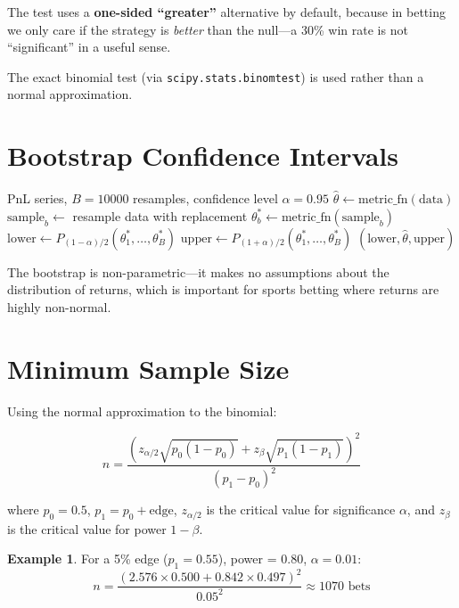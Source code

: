 \documentclass[12pt,a4paper]{report}
\theoremstyle{definition}
\newtheorem{example}{Example}[chapter]
\newcommand{\code}[1]{\texttt{#1}}
\begin{document}
The test uses a \textbf{one-sided ``greater''} alternative by default, because in betting we only care if the strategy is \emph{better} than the null—a 30\% win rate is not ``significant'' in a useful sense.

The exact binomial test (via \code{scipy.stats.binomtest}) is used rather than a normal approximation.

\section{Bootstrap Confidence Intervals}
\label{sec:bootstrap}

\begin{algorithm}[H]
\caption{Bootstrap Confidence Interval}
\begin{algorithmic}[1]
\Require PnL series, $B = 10000$ resamples, confidence level $\alpha = 0.95$
\State $\hat{\theta} \gets \text{metric\_fn}(\text{data})$ 
    \State $\text{sample}_b \gets$ resample data with replacement
    \State $\theta_b^* \gets \text{metric\_fn}(\text{sample}_b)$
\EndFor
\State $\text{lower} \gets P_{(1-\alpha)/2}(\theta_1^*, \ldots, \theta_B^*)$
\State $\text{upper} \gets P_{(1+\alpha)/2}(\theta_1^*, \ldots, \theta_B^*)$
\State \Return $(\text{lower}, \hat{\theta}, \text{upper})$
\end{algorithmic}
\end{algorithm}

The bootstrap is non-parametric—it makes no assumptions about the distribution of returns, which is important for sports betting where returns are highly non-normal.

\section{Minimum Sample Size}
\label{sec:min-sample}

Using the normal approximation to the binomial:

\begin{equation}
    n = \frac{\left(z_{\alpha/2}\sqrt{p_0(1-p_0)} + z_{\beta}\sqrt{p_1(1-p_1)}\right)^2}{(p_1 - p_0)^2}
    \label{eq:min-sample}
\end{equation}

where $p_0 = 0.5$, $p_1 = p_0 + \text{edge}$, $z_{\alpha/2}$ is the critical value for significance $\alpha$, and $z_{\beta}$ is the critical value for power $1 - \beta$.

\begin{example}
For a 5\% edge ($p_1 = 0.55$), power = 0.80, $\alpha = 0.01$:
\[
    n = \frac{(2.576 \times 0.500 + 0.842 \times 0.497)^2}{0.05^2} \approx 1070 \text{ bets}
\]
\end{example}
\end{document}
